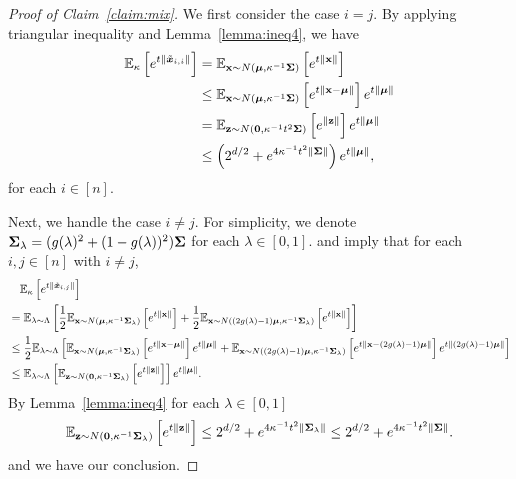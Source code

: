 \begin{proof}[Proof of Claim~\ref{claim:mix}]
We first consider the case $i = j$. By applying triangular inequality and Lemma~\ref{lemma:ineq4}, we have
\begin{align*}
\mathbb{E}_\kappa \left[ e^{t \left \lVert \tilde{{\bm{x}}}_{i,i}\right \rVert} \right] 
&= \mathbb{E}_{{\mathbf{x}} \sim N({\bm{\mu}}, \kappa^{-1} {\bm{\Sigma}}) } \left[ e^{t \left \lVert {\mathbf{x}}\right \rVert} \right] \\
&\leq \mathbb{E}_{{\mathbf{x}} \sim N({\bm{\mu}}, \kappa^{-1} {\bm{\Sigma}}) } \left[ e^{t \left \lVert {\mathbf{x}} - {\bm{\mu}} \right \rVert} \right] e^{t\lVert {\bm{\mu}} \rVert}\\
&= \mathbb{E}_{{\mathbf{z}} \sim N({\bm{0}}, \kappa^{-1}t^2 {\bm{\Sigma}} )} \left[e^{\lVert {\mathbf{z}} \rVert} \right] e^{t\lVert {\bm{\mu}} \rVert} \\
&\leq \left( 2^{d/2} + e^{4\kappa^{-1}t^2 \lVert {\bm{\Sigma}} \rVert}\right)e^{t\lVert {\bm{\mu}} \rVert},
\end{align*}
for each $i \in [n]$.

Next, we handle the case $i \neq j$. For simplicity, we denote ${\bm{\Sigma}}_\lambda = (g(\lambda)^2 + (1-g(\lambda))^2) {\bm{\Sigma}}$ for each $\lambda \in [0,1]$.  and  imply that for each $i,j\in[n]$ with $i \neq j$,
\begin{align*}
&\quad \mathbb{E}_\kappa\left[ e^{t\lVert \tilde{{\bm{x}}}_{i,j} \rVert}\right]\\
&= \mathbb{E}_{\lambda \sim \Lambda} \left[ \frac{1}{2} \mathbb{E}_{{\mathbf{x}} \sim N({\bm{\mu}}, \kappa^{-1} {\bm{\Sigma}}_\lambda)}\left[ e^{t\lVert {\mathbf{x}}\rVert}\right] +\frac{1}{2} \mathbb{E}_{{\mathbf{x}} \sim N((2g(\lambda)-1){\bm{\mu}}, \kappa^{-1} {\bm{\Sigma}}_\lambda)}\left[ e^{t\lVert {\mathbf{x}}\rVert}\right]\right]\\
&\leq \frac{1}{2} \mathbb{E}_{\lambda \sim \Lambda}\left[\mathbb{E}_{{\mathbf{x}} \sim N({\bm{\mu}}, \kappa^{-1} {\bm{\Sigma}}_\lambda)}\left[ e^{t\lVert {\mathbf{x}} -{\bm{\mu}} \rVert}\right]e^{t\lVert {\bm{\mu}} \rVert} + \mathbb{E}_{{\mathbf{x}} \sim N((2g(\lambda)-1){\bm{\mu}}, \kappa^{-1} {\bm{\Sigma}}_\lambda)}\left[ e^{t\lVert {\mathbf{x}} - (2g(\lambda)-1){\bm{\mu}}\rVert}\right] e^{t\lVert (2g(\lambda)-1){\bm{\mu}} \rVert}\right]\\
&\leq \mathbb{E}_{\lambda \sim \Lambda}\left[ \mathbb{E}_{{\mathbf{z}} \sim N({\bm{0}}, \kappa^{-1} {\bm{\Sigma}}_\lambda) }\left[ e^{t\lVert {\mathbf{z}} \rVert}\right]\right] e^{t\lVert {\bm{\mu}}\rVert}.
\end{align*}
By Lemma~\ref{lemma:ineq4} for each $\lambda \in [0,1]$ 
\begin{equation*}
\mathbb{E}_{{\mathbf{z}} \sim N({\bm{0}}, \kappa^{-1} {\bm{\Sigma}}_\lambda) }\left[ e^{t\lVert {\mathbf{z}} \rVert}\right] \leq 2^{d/2} + e^{4\kappa^{-1}t^2 \lVert {\bm{\Sigma}}_\lambda\rVert} \leq 2^{d/2} + e^{4\kappa
^{-1}t^2 \lVert {\bm{\Sigma}}\rVert}.
\end{equation*}
and we have our conclusion.
\end{proof}

